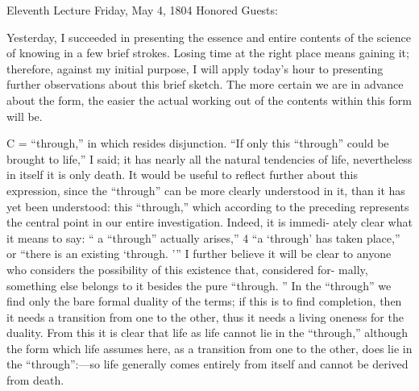 Eleventh Lecture
Friday, May 4, 1804
Honored Guests:

Yesterday, I succeeded in presenting the essence
and entire contents of the science of knowing in a few brief strokes.
Losing time at the right place means gaining it;
therefore, against my initial purpose, I will apply today’s hour to
presenting further observations about this brief sketch.
The more certain we are in advance about the form,
the easier the actual working out
of the contents within this form will be.

C = “through,” in which resides disjunction.
“If only this “through”
could be brought to life,” I said;
it has nearly all the natural tendencies of life,
nevertheless in itself it is only death.
It would be useful to reflect further about this expression,
since the “through” can be more clearly understood in it,
than it has yet been understood:
this “through,” which according to the preceding
represents the central point in our entire investigation.
 Indeed, it is immedi-
ately clear what it means to say: “ a “through” actually arises,” 4 “a ‘through’ has
taken place,” or “there is an existing ‘through.
’” I further believe it will be clear
to anyone who considers the possibility of this existence that, considered for-
mally, something else belongs to it besides the pure “through.
” In the “through”
we find only the bare formal duality of the terms; if this is to find completion,
then it needs a transition from one to the other, thus it needs a living oneness
for the duality.
 From this it is clear that life as life cannot lie in the “through,”
although the form which life assumes here, as a transition from one to the
other, does lie in the “through”:—so life generally comes entirely from itself
and cannot be derived from death.

